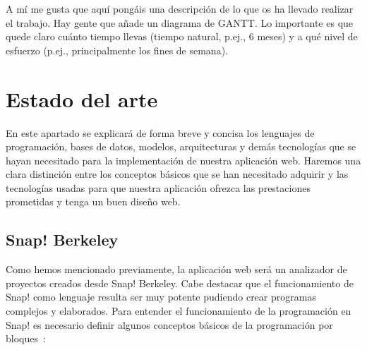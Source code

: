 \documentclass[a4paper, 12pt]{book}
\begin{document}
A mí me gusta que aquí pongáis una descripción de lo que os ha llevado realizar el trabajo.
Hay gente que añade un diagrama de GANTT.
Lo importante es que quede claro cuánto tiempo llevas (tiempo natural, p.ej., 6 meses) y a qué nivel de esfuerzo (p.ej., principalmente los fines de semana).



\cleardoublepage
\chapter{Estado del arte}
\label{chap:estado}

En este apartado se explicará de forma breve y concisa los lenguajes de programación, bases de datos, modelos, arquitecturas y demás tecnologías que se hayan necesitado para la implementación de nuestra aplicación web. Haremos una clara distinción entre los conceptos básicos que se han necesitado adquirir y las tecnologías usadas para que nuestra aplicación ofrezca las prestaciones prometidas y tenga un buen diseño web.

\section{Snap! Berkeley}
Como hemos mencionado previamente, la aplicación web será un analizador de proyectos creados desde Snap! Berkeley. Cabe destacar que el funcionamiento de Snap! como lenguaje resulta ser muy potente pudiendo crear programas complejos y elaborados. Para entender el funcionamiento de la programación en Snap! es necesario definir algunos conceptos básicos de la programación por bloques~\cite{harvey2017snap}:
\end{document}
